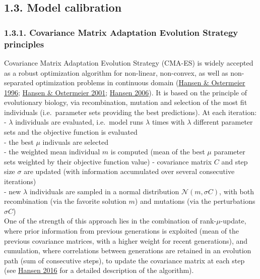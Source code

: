\documentclass[11pt,]{article}
\begin{document}
\hypertarget{model-calibration}{%
\subsection{1.3. Model calibration}\label{model-calibration}}

\hypertarget{covariance-matrix-adaptation-evolution-strategy-principles}{%
\subsubsection{1.3.1. Covariance Matrix Adaptation Evolution Strategy
principles}\label{covariance-matrix-adaptation-evolution-strategy-principles}}

Covariance Matrix Adaptation Evolution Strategy (CMA-ES) is widely
accepted as a robust optimization algorithm for non-linear, non-convex,
as well as non-separated optimization problems in continuous domain
(\protect\hyperlink{ref-Hansen1996}{Hansen \& Ostermeier 1996};
\protect\hyperlink{ref-Hansen2001}{Hansen \& Ostermeier 2001};
\protect\hyperlink{ref-Hansen2006}{Hansen 2006}). It is based on the
principle of evolutionary biology, via recombination, mutation and
selection of the most fit individuals (i.e.~parameter sets providing the
best predictions). At each iteration:\\
- \(\lambda\) individuals are evaluated, i.e.~model runs \(\lambda\)
times with \(\lambda\) different parameter sets and the objective
function is evaluated\\
- the best \(\mu\) indivuals are selected\\
- the weighted mean individual \(m\) is computed (mean of the best
\(\mu\) parameter sets weighted by their objective function value) -
covariance matrix \(C\) and step size \(\sigma\) are updated (with
information accumulated over several consecutive iterations)\\
- new \(\lambda\) individuals are sampled in a normal distribution
\(\mathcal{N}(m, \sigma C)\), with both recombination (via the favorite
solution \(m\)) and mutations (via the perturbations \(\sigma C\))\\
One of the strength of this approach lies in the combination of
rank-\(\mu\)-update, where prior information from previous generations
is exploited (mean of the previous covariance matrices, with a higher
weight for recent generations), and cumulation, where correlations
between generations are retained in an evolution path (sum of
consecutive steps), to update the covariance matrix at each step (see
\protect\hyperlink{ref-Hansen2016}{Hansen 2016} for a detailed
description of the algorithm).
\end{document}
